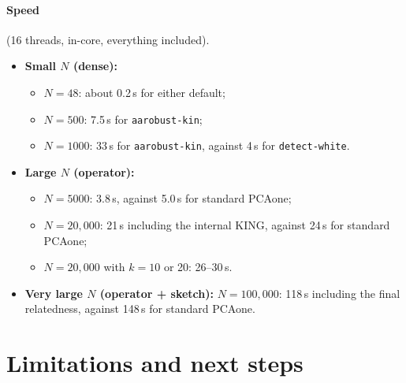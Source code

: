 \documentclass[11pt,a4paper]{article}
\begin{document}
\paragraph{Speed} (16 threads, in-core, everything included).
\begin{itemize}
  \item \textbf{Small $N$ (dense):}
    \begin{itemize}
      \item $N=48$: about 0.2\,s for either default;
      \item $N=500$: 7.5\,s for \texttt{aarobust-kin};
      \item $N=1000$: 33\,s for \texttt{aarobust-kin}, against 4\,s for
        \texttt{detect-white}.
    \end{itemize}
  \item \textbf{Large $N$ (operator):}
    \begin{itemize}
      \item $N=5000$: 3.8\,s, against 5.0\,s for standard PCAone;
      \item $N=20{,}000$: 21\,s including the internal KING, against 24\,s
        for standard PCAone;
      \item $N=20{,}000$ with $k=10$ or 20: 26--30\,s.
    \end{itemize}
  \item \textbf{Very large $N$ (operator + sketch):} $N=100{,}000$: 118\,s
    including the final relatedness, against 148\,s for standard PCAone.
\end{itemize}

\section{Limitations and next steps}
\end{document}
